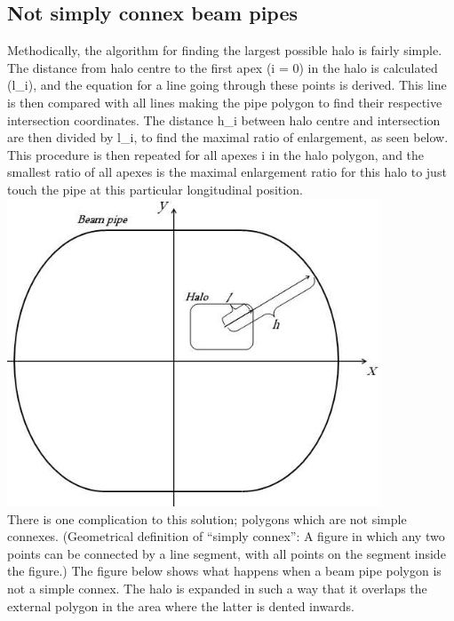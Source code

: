 \subsection{Not simply connex beam pipes} 
Methodically, the algorithm for finding the largest possible halo is
fairly simple. The distance from halo centre to the first apex (i = 0)
in the halo is calculated (l\_i), and the equation for a line going
through these points is derived. This line is then compared with all
lines making the pipe polygon to find their respective intersection
coordinates. The distance h\_i between halo centre and intersection are
then divided by l\_i, to find the maximal ratio of enlargement, as seen
below. This procedure is then repeated for all apexes i in the halo
polygon, and the smallest ratio  of all apexes is the maximal
enlargement ratio for this halo to just touch the pipe at this
particular longitudinal position. 
\\
\includegraphics[width=420px]{Introduction/notsimple0.jpg}
\\  
There is one complication to this solution; polygons which are not
simple connexes. (Geometrical definition of ``simply connex'': A figure
in which any two points can be connected by a line segment, with all
points on the segment inside the figure.) The figure below shows what
happens when a beam pipe polygon is not a simple connex. The halo is
expanded in such a way that it overlaps the external polygon in the area
where the latter is dented inwards. 
\\
